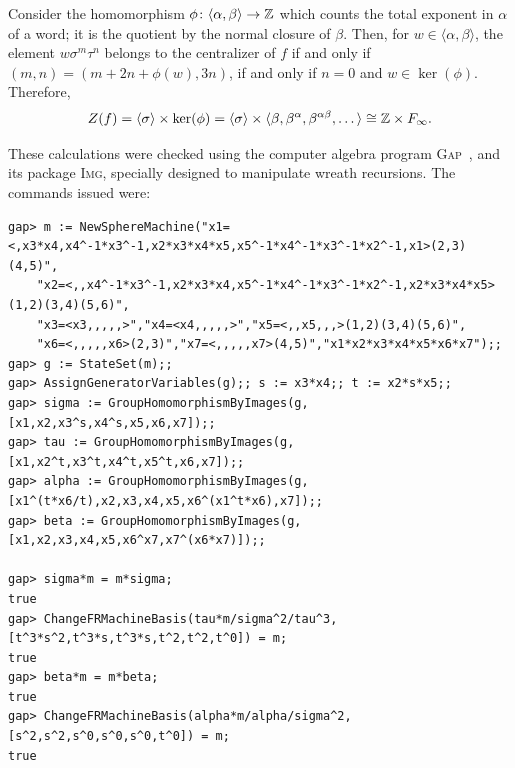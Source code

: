 \documentclass{amsart}
\begin{document}
Consider the homomorphism $\phi\colon\langle\alpha,\beta\rangle\to{\mathbb Z}$
which counts the total exponent in $\alpha$ of a word; it is the
quotient by the normal closure of $\beta$. Then, for
$w\in\langle\alpha,\beta\rangle$, the element $w\sigma^m\tau^n$
belongs to the centralizer of $f$ if and only if
$(m,n)=(m+2n+\phi(w),3n)$, if and only if $n=0$ and
$w\in\ker(\phi)$. Therefore,
\[Z(f)=\langle\sigma\rangle\times\ker(\phi)=\langle\sigma\rangle\times\langle\beta,\beta^\alpha,\beta^{\alpha\beta},\dots\rangle\cong{\mathbb Z}\times F_\infty.\]

These calculations were checked using the computer algebra program
\textsc{Gap}~\cite{gap4:manual}, and its package \textsc{Img},
specially designed to manipulate wreath recursions. The commands issued were:
{\footnotesize\begin{verbatim}
gap> m := NewSphereMachine("x1=<,x3*x4,x4^-1*x3^-1,x2*x3*x4*x5,x5^-1*x4^-1*x3^-1*x2^-1,x1>(2,3)(4,5)",
	"x2=<,,x4^-1*x3^-1,x2*x3*x4,x5^-1*x4^-1*x3^-1*x2^-1,x2*x3*x4*x5>(1,2)(3,4)(5,6)",
	"x3=<x3,,,,,>","x4=<x4,,,,,>","x5=<,,x5,,,>(1,2)(3,4)(5,6)",
	"x6=<,,,,,x6>(2,3)","x7=<,,,,,x7>(4,5)","x1*x2*x3*x4*x5*x6*x7");;
gap> g := StateSet(m);;
gap> AssignGeneratorVariables(g);; s := x3*x4;; t := x2*s*x5;;
gap> sigma := GroupHomomorphismByImages(g,[x1,x2,x3^s,x4^s,x5,x6,x7]);;
gap> tau := GroupHomomorphismByImages(g,[x1,x2^t,x3^t,x4^t,x5^t,x6,x7]);;
gap> alpha := GroupHomomorphismByImages(g,[x1^(t*x6/t),x2,x3,x4,x5,x6^(x1^t*x6),x7]);;
gap> beta := GroupHomomorphismByImages(g,[x1,x2,x3,x4,x5,x6^x7,x7^(x6*x7)]);;

gap> sigma*m = m*sigma;
true
gap> ChangeFRMachineBasis(tau*m/sigma^2/tau^3,[t^3*s^2,t^3*s,t^3*s,t^2,t^2,t^0]) = m;
true
gap> beta*m = m*beta;
true
gap> ChangeFRMachineBasis(alpha*m/alpha/sigma^2,[s^2,s^2,s^0,s^0,s^0,t^0]) = m;
true
\end{verbatim}}

\begin{bibdiv}
\begin{biblist}
\end{biblist}
\end{bibdiv}

\end{document}
